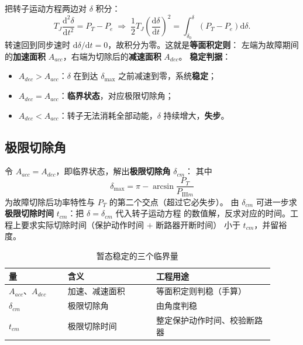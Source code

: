 把转子运动方程两边对 $\delta$ 积分：
\begin{equation}
  T_J\frac{\mathrm{d}^{2}\delta}{\mathrm{d}t^{2}}=P_T-P_e
  \;\Longrightarrow\;
  \frac{1}{2}T_J\left(\frac{\mathrm{d}\delta}{\mathrm{d}t}\right)^{2}
  =\int_{\delta_0}^{\delta}\left(P_T-P_e\right)\mathrm{d}\delta .
\end{equation}
转速回到同步速时 $\mathrm{d}\delta/\mathrm{d}t=0$，故积分为零。这就是\textbf{等面积定则}：
左端为故障期间的\textbf{加速面积} $A_{acc}$，右端为切除后的\textbf{减速面积} $A_{dec}$。
\textbf{稳定判据}：
\begin{itemize}
  \item $A_{dec}>A_{acc}$：$\delta$ 在到达 $\delta_{\max}$ 之前减速到零，系统\textbf{稳定}；
  \item $A_{dec}=A_{acc}$：\textbf{临界状态}，对应极限切除角；
  \item $A_{dec}<A_{acc}$：转子无法消耗全部动能，$\delta$ 持续增大，\textbf{失步}。
\end{itemize}

\subsection{极限切除角}

令 $A_{acc}=A_{dec}$，即临界状态，解出\textbf{极限切除角} $\delta_{cm}$：
其中
\begin{equation}
  \delta_{\max}=\pi-\arcsin\frac{P_T}{P_{\text{III}m}}
\end{equation}
为故障切除后功率特性与 $P_T$ 的第二个交点（超过它必失步）。
由 $\delta_{cm}$ 可进一步求\textbf{极限切除时间} $t_{cm}$：把 $\delta=\delta_{cm}$ 代入转子运动方程
的数值解，反求对应的时间。工程上要求实际切除时间（保护动作时间 $+$ 断路器开断时间）
小于 $t_{cm}$，并留裕度。

\begin{table}[htbp]
  \centering
  \caption{暂态稳定的三个临界量}
  \small
  \begin{tabular}{@{}p{0.20\linewidth}p{0.30\linewidth}p{0.40\linewidth}@{}}
    \toprule
    量 & 含义 & 工程用途 \\
    \midrule
    $A_{acc}$、$A_{dec}$ & 加速、减速面积 & 等面积定则判稳（手算） \\
    $\delta_{cm}$ & 极限切除角 & 由角度判稳 \\
    $t_{cm}$ & 极限切除时间 & 整定保护动作时间、校验断路器 \\
    \bottomrule
  \end{tabular}
\end{table}

